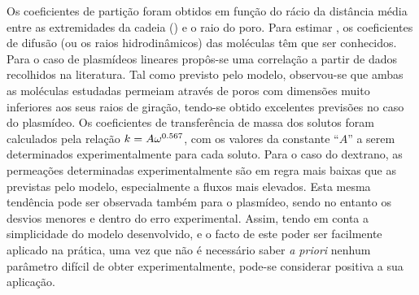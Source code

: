 Os coeficientes de partição foram obtidos em função do rácio da distância média entre as extremidades da cadeia (\distanciah) e o raio do poro. Para estimar \distanciah, os coeficientes de difusão (ou os raios hidrodinâmicos) das moléculas têm que ser conhecidos. Para o caso de plasmídeos lineares propôs-se uma correlação a partir de dados recolhidos na literatura. Tal como previsto pelo modelo, observou-se que ambas as moléculas estudadas permeiam através de poros com dimensões muito inferiores aos seus raios de giração, tendo-se obtido excelentes previsões no caso do plasmídeo. Os coeficientes de transferência de massa dos solutos foram calculados pela relação $k=A\omega^{0.567}$, com os valores da constante ``$A$'' a serem determinados experimentalmente para cada soluto. Para o caso do dextrano, as permeações determinadas experimentalmente são em regra mais baixas que as previstas pelo modelo, especialmente a fluxos mais elevados. Esta mesma tendência pode ser observada também para o plasmídeo, sendo no entanto os desvios menores e dentro do erro experimental. Assim, tendo em conta a simplicidade do modelo desenvolvido, e o facto de este poder ser facilmente aplicado na prática, uma vez que não é necessário saber \emph{a priori} nenhum parâmetro difícil de obter experimentalmente, pode-se considerar positiva a sua aplicação.
